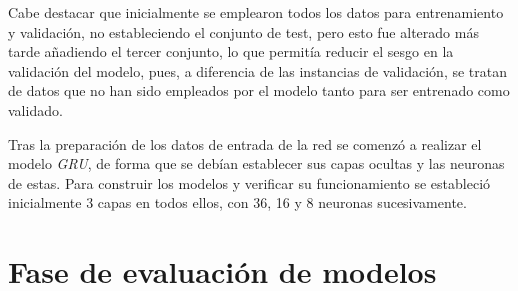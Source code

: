 
Cabe destacar que inicialmente se emplearon todos los datos para entrenamiento y validación, no estableciendo
el conjunto de test, pero esto fue alterado más tarde añadiendo el tercer conjunto, lo que 
permitía reducir el sesgo en la validación del modelo, pues, a diferencia de las instancias de validación, se tratan
de datos que no han sido empleados por el modelo tanto para ser entrenado como validado.

Tras la preparación de los datos de entrada de la red se comenzó a realizar el modelo \textit{GRU}, de forma
que se debían establecer sus capas ocultas y las neuronas de estas.
Para construir los modelos y verificar su funcionamiento se estableció inicialmente 3 capas en todos ellos, con
36, 16 y 8 neuronas sucesivamente.

\section{Fase de evaluación de modelos}
